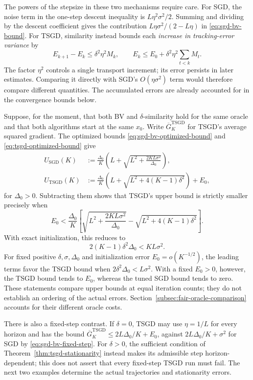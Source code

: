 The powers of the stepsize in these two mechanisms require care.
For SGD, the noise term in the one-step descent inequality is
$L\eta^2\sigma^2/2$. Summing and dividing by the descent coefficient
gives the contribution $L\eta\sigma^2/(2-L\eta)$ in
\eqref{eq:sgd-bv-bound}. For TSGD, similarity instead bounds each
\emph{increase in tracking-error variance} by
\[
E_{k+1}-E_k\leq\delta^2\eta^2M_k,
\qquad
E_k\leq E_0+\delta^2\eta^2\sum_{t<k}M_t.
\]
The factor $\eta^2$ controls a single transport increment; its error
persists in later estimates. Comparing it directly with SGD's
$O(\eta\sigma^2)$ term would therefore compare different quantities.
The accumulated errors are already accounted for in the convergence
bounds below.

Suppose, for the moment, that both BV and $\delta$-similarity hold for
the same oracle and that both algorithms start at the same $x_0$.
Write $\overline G_K^{\mathrm{TSGD}}$ for TSGD's average squared
gradient. The optimized bounds \eqref{eq:sgd-bv-optimized-bound} and
\eqref{eq:tsgd-optimized-bound} give
\[
\begin{aligned}
U_{\mathrm{SGD}}(K)
&:=\frac{\Delta_0}{K}
   \left(L+\sqrt{L^2+\frac{2KL\sigma^2}{\Delta_0}}\right),\\
U_{\mathrm{TSGD}}(K)
&:=\frac{\Delta_0}{K}
   \left(L+\sqrt{L^2+4(K-1)\delta^2}\right)+E_0,
\end{aligned}
\]
for $\Delta_0>0$. Subtracting them shows that TSGD's upper bound is
strictly smaller precisely when
\begin{equation}
\label{eq:optimized-certificate-comparison}
\boxed{E_0<\frac{\Delta_0}{K}
\left[\sqrt{L^2+\frac{2KL\sigma^2}{\Delta_0}}
      -\sqrt{L^2+4(K-1)\delta^2}\right].}
\end{equation}
With exact initialization, this reduces to
\begin{equation}
\label{eq:equal-horizon-comparison}
2(K-1)\delta^2\Delta_0<KL\sigma^2.
\end{equation}
For fixed positive $\delta,\sigma,\Delta_0$ and initialization error
$E_0=o(K^{-1/2})$, the leading terms favor the TSGD bound when
$2\delta^2\Delta_0<L\sigma^2$. With a fixed $E_0>0$, however,
the TSGD bound tends to $E_0$, whereas the tuned SGD bound tends to
zero. These statements compare upper bounds at equal iteration
counts; they do not establish an ordering of the actual errors.
Section~\ref{subsec:fair-oracle-comparison} accounts for their
different oracle costs.

There is also a fixed-step contrast. If $\delta=0$, TSGD may use
$\eta=1/L$ for every horizon and has the bound
$\overline G_K^{\mathrm{TSGD}}\leq2L\Delta_0/K+E_0$, against
$2L\Delta_0/K+\sigma^2$ for SGD by
\eqref{eq:sgd-bv-fixed-step}. For $\delta>0$, the sufficient
condition of Theorem~\ref{thm:tsgd-stationarity} instead makes its
admissible step horizon-dependent; this does not assert that every
fixed-step TSGD run must fail. The next two examples determine the
actual trajectories and stationarity errors.

